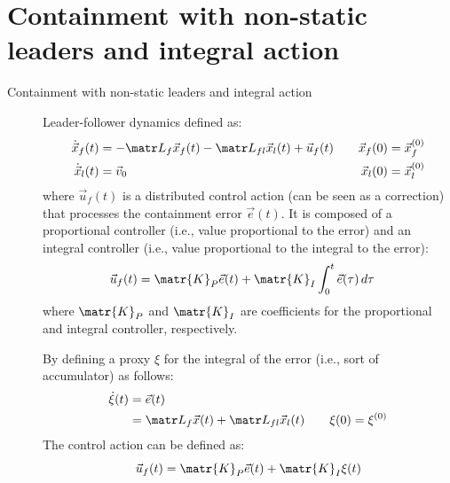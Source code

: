 \section{Containment with non-static leaders and integral action}

\begin{description}
    \item[Containment with non-static leaders and integral action] 
        Leader-follower dynamics defined as:
        \[
            \begin{aligned}
                \dot{\x}_f(t) &= -\lap_f \x_f(t) - \lap_{fl} \x_l(t) + \vec{u}_f(t) \quad & \x_f(0) &= \x_f^{(0)} \\
                \dot{\x}_l(t) &= \vec{v}_0 \quad & \x_l(0) &= \x_l^{(0)} \\
            \end{aligned}
        \]
        where $\vec{u}_f(t)$ is a distributed control action (can be seen as a correction) that processes the containment error $\vec{e}(t)$. It is composed of a proportional controller (i.e., value proportional to the error) and an integral controller (i.e., value proportional to the integral to the error):
        \[
            \begin{split}
                \vec{u}_f(t) &= \matr{K}_P \vec{e}(t) + \matr{K}_I \int_{0}^{t} \vec{e}(\tau) \,d\tau
            \end{split}
        \]
        where $\matr{K}_P$ and $\matr{K}_I$ are coefficients for the proportional and integral controller, respectively.
        
        By defining a proxy $\xi$ for the integral of the error (i.e., sort of accumulator) as follows:
        \[
            \begin{split}
                \dot{\xi}(t) &= \vec{e}(t) \\
                    &= \lap_f \vec{x}(t) + \lap_{fl} \x_l(t) \qquad \xi(0) = \xi^{(0)}
            \end{split}
        \]
        The control action can be defined as:
        \[
            \vec{u}_f(t) = \matr{K}_P \vec{e}(t) + \matr{K}_I \xi(t)
        \]


\end{description}
